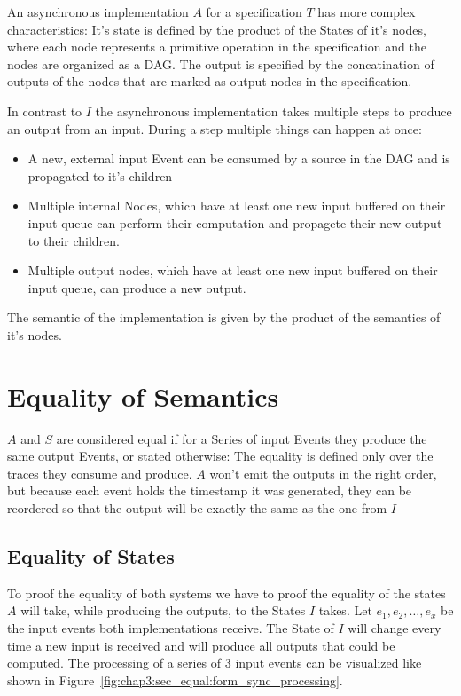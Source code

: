 An asynchronous implementation \(A\) for a specification \(T\) has more complex characteristics:
It's state is defined by the product of the States of it's nodes, where each node represents a primitive operation in
the specification and the nodes are organized as a DAG.%
The output is specified by the concatination of outputs of the nodes that are marked as output nodes in the specification.

In contrast to \(I\) the asynchronous implementation takes multiple steps to produce an output from an input.
During a step multiple things can happen at once:
\begin{itemize}
    \item A new, external input Event can be consumed by a source in the DAG and is propagated to it's children
    \item Multiple internal Nodes, which have at least one new input buffered on their input queue can perform
        their computation and propagete their new output to their children.
    \item Multiple output nodes, which have at least one new input buffered on their input queue, can produce a
        new output.
\end{itemize}

The semantic of the implementation is given by the product of the semantics of it's nodes.

\section{Equality of Semantics}
\(A\) and \(S\) are considered equal if for a Series of input Events they produce the same output Events, or stated otherwise:
The equality is defined only over the traces they consume and produce.
\(A\) won't emit the outputs in the right order, but because each event holds the timestamp it was generated, they can
be reordered so that the output will be exactly the same as the one from \(I\)

\subsection{Equality of States}
To proof the equality of both systems we have to proof the equality of the states \(A\) will take, while producing the
outputs, to the States \(I\) takes.
Let \(e_1, e_2, \dots, e_x\) be the input events both implementations receive.
The State of \(I\) will change every time a new input is received and will produce all outputs that could be computed.
The processing of a series of 3 input events can be visualized like shown in Figure~\ref{fig:chap3:sec_equal:form_sync_processing}.

